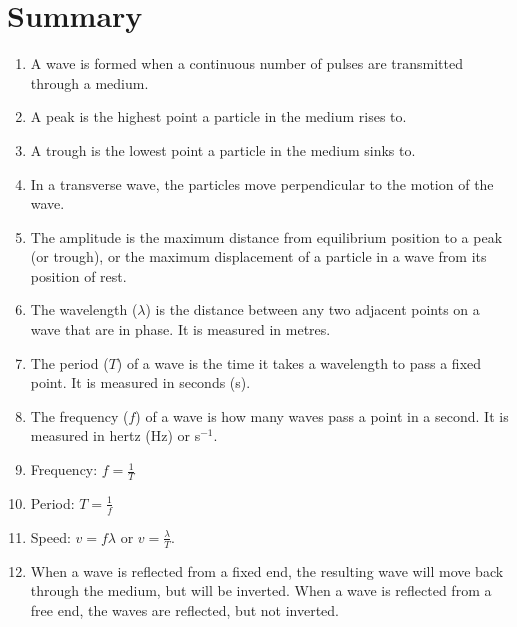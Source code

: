 \section{Summary}
\begin{enumerate}
\item A wave is formed when a continuous number of pulses are transmitted through a medium.
\item A peak is the highest point a particle in the medium rises to. 
\item A trough is the lowest point a particle in the medium sinks to.
\item In a transverse wave, the particles move perpendicular to the motion of the wave.
\item The amplitude is the maximum distance from equilibrium position to a peak (or trough), or the maximum displacement of a particle in a wave from its position of rest.
\item The wavelength ($\lambda$) is the distance between any two adjacent points on a wave that are in phase. It is measured in metres.
\item The period ($T$) of a wave is the time it takes a wavelength to pass a fixed point. It is measured in seconds (s).
\item The frequency ($f$) of a wave is how many waves pass a point in a second. It is measured in hertz (Hz) or s$^{-1}$.
\item Frequency: $f=\frac{1}{T}$
\item Period: $T=\frac{1}{f}$
\item Speed: $v=f\lambda$ or $v=\frac{\lambda}{T}$.
\item When a wave is reflected from a fixed end, the resulting wave will move back through the medium, but will be inverted. When a wave is reflected from a free end, the waves are reflected, but not inverted.

\end{enumerate}



